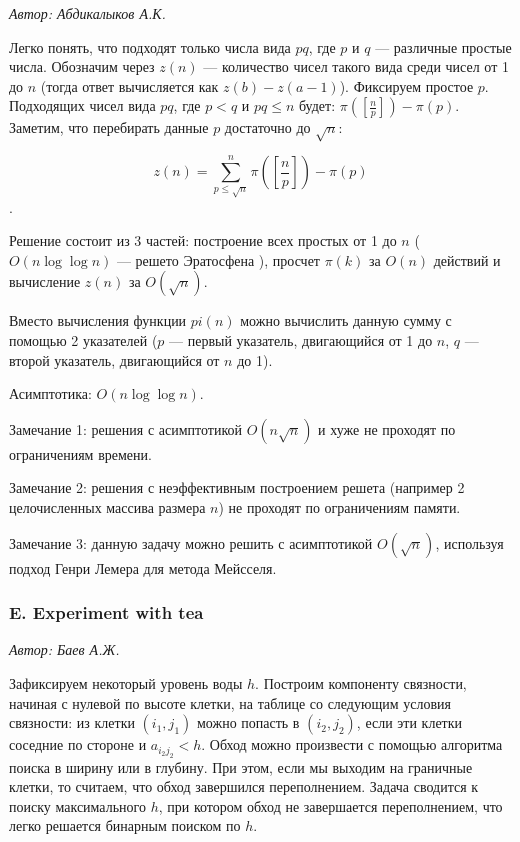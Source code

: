 \documentclass[11pt, a4paper]{article}
\newcommand{\problemauthor}[1]{
\begin{flushright}
\textit{Автор: #1}
\end{flushright}
}
\begin{document}
\problemauthor{ Абдикалыков А.К.}

Легко понять, что подходят только числа вида $pq$, где $p$ и $q$ --- различные простые числа. Обозначим через $z(n)$ --- количество чисел такого вида среди чисел от 1 до $n$ (тогда ответ вычисляется как $z(b) - z(a-1)$). Фиксируем простое $p$. Подходящих чисел вида $pq$, где $p < q$ и $pq \le n$ будет: $ \pi\left( \left[ \frac{n}{p} \right] \right) - \pi(p)$. Заметим, что перебирать данные $p$ достаточно до $\sqrt{n}$:

$$z(n) = \sum_{p \le \sqrt{n}}^{n} \pi\left(\left[ \frac{n}{p} \right] \right) - \pi(p)$$.

Решение состоит из 3 частей: построение всех простых от 1 до $n$ ($O(n \log \log{n})$ --- решето Эратосфена ), просчет $\pi(k)$ за $O(n)$ действий и вычисление $z(n)$ за $O(\sqrt{n})$. 

Вместо вычисления функции $pi(n)$ можно вычислить данную сумму с помощью 2 указателей ($p$ --- первый указатель, двигающийся от 1 до $n$, $q$ --- второй указатель, двигающийся от $n$ до 1).

Асимптотика: $O(n \log \log{n})$. 

Замечание 1: решения с асимптотикой $O(n \sqrt{n})$ и хуже не проходят по ограничениям времени.

Замечание 2: решения с неэффективным построением решета (например 2 целочисленных массива размера $n$) не проходят по ограничениям памяти.

Замечание 3: данную задачу можно решить с асимптотикой $O( \sqrt{n} )$, используя подход Генри Лемера для метода Мейсселя.



\subsubsection*{E. Experiment with tea} 

\problemauthor{ Баев А.Ж.}

Зафиксируем некоторый уровень воды $h$. Построим компоненту связности, начиная с нулевой по высоте клетки, на таблице со следующим условия связности: из клетки $(i_1, j_1)$ можно попасть в $(i_2, j_2)$, если эти клетки соседние по стороне и $a_{i_2 j_2} < h$. Обход можно произвести с помощью алгоритма поиска в ширину или в глубину. При этом, если мы выходим на граничные клетки, то считаем, что обход завершился переполнением. Задача сводится к поиску максимального $h$, при котором обход не завершается переполнением, что легко решается бинарным поиском по $h$.
\end{document}

